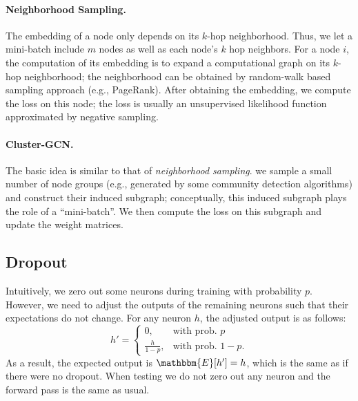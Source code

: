                 \paragraph{Neighborhood Sampling.} The embedding of a node only depends on its $k$-hop neighborhood.
                Thus, we let a mini-batch include $m$ nodes as well as each node's $k$ hop neighbors.
                For a node $i$, the computation of its embedding is to expand a computational graph on its $k$-hop neighborhood; the neighborhood can be obtained by random-walk based sampling approach (e.g., PageRank).
                After obtaining the embedding, we  compute the loss on this node; the loss is usually an unsupervised likelihood function approximated by negative sampling.
                \paragraph{Cluster-GCN.} The basic idea is similar to that of \emph{neighborhood sampling}.
                we sample a small number of node groups (e.g., generated by some community detection algorithms) and construct their induced subgraph; conceptually, this induced subgraph plays the role of a ``mini-batch''.
                We then compute the loss on this  subgraph and update the weight matrices. 

            
\subsection{Dropout}
    Intuitively, we zero out some neurons during training with probability $p$.
    However, we need to adjust the outputs of the remaining neurons such that their expectations do not change.
    For any neuron $h$, the adjusted output is as follows:
        \begin{equation}
            h' = \begin{cases}
                    0, & \text{with prob. $p$} \\
                    \frac{h}{1-p}, & \text{with prob. $1-p$}.
                 \end{cases}
        \end{equation}
    As a result, the expected output is $\mathbbm{E}[h'] = h$, which is the same as if there were no dropout.
    When testing we do not zero out any neuron and the forward pass is the same as usual.
    

